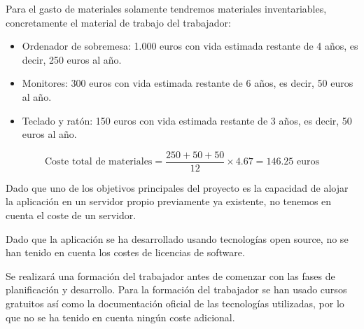 Para el gasto de materiales solamente tendremos materiales inventariables, concretamente el material de trabajo del trabajador:
\begin{itemize}
    \item Ordenador de sobremesa: 1.000 euros con vida estimada restante de 4 años, es decir, 250 euros al año.
    \item Monitores: 300 euros con vida estimada restante de 6 años, es decir, 50 euros al año.
    \item Teclado y ratón: 150 euros con vida estimada restante de 3 años, es decir, 50 euros al año.
\end{itemize}
\begin{equation}
    \text{Coste total de materiales} = \dfrac{250 + 50 + 50}{12} \times 4.67 = 146.25 \text{ euros}
\end{equation}

Dado que uno de los objetivos principales del proyecto es la capacidad de alojar la aplicación en un servidor propio previamente ya existente, no tenemos en cuenta el coste de un servidor.

Dado que la aplicación se ha desarrollado usando tecnologías open source, no se han tenido en cuenta los costes de licencias de software.

Se realizará una formación del trabajador antes de comenzar con las fases de planificación y desarrollo. Para la formación del trabajador se han usado cursos gratuitos así como la documentación oficial de las tecnologías utilizadas, por lo que no se ha tenido en cuenta ningún coste adicional.

